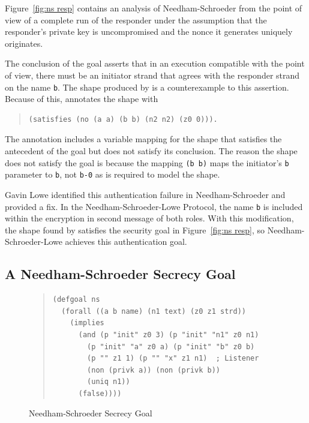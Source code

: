 Figure~\ref{fig:ns resp} contains an analysis of Needham-Schroeder
from the point of view of a complete run of the responder under the
assumption that the responder's private key is uncompromised and the
nonce it generates uniquely originates.

The conclusion of the goal asserts that in an execution compatible
with the point of view, there must be an initiator strand that agrees
with the responder strand on the name \texttt{b}.  The shape produced
by {\cpsa} is a counterexample to this assertion.  Because of this,
{\cpsa} annotates the shape with
\begin{quote}
\begin{verbatim}
(satisfies (no (a a) (b b) (n2 n2) (z0 0))).
\end{verbatim}
\end{quote}
The annotation includes a variable mapping for the shape that
satisfies the antecedent of the goal but does not satisfy its
conclusion.  The reason the shape does not satisfy the goal is because
the mapping \texttt{(b b)} maps the initiator's \texttt{b} parameter
to \texttt{b}, not \texttt{b-0} as is required to model the shape.

Gavin Lowe identified this authentication failure in
Needham-Schroeder and provided a fix.  In the Needham-Schroeder-Lowe
Protocol, the name \texttt{b} is included within the encryption in second
message of both roles.  With this modification, the shape found by
{\cpsa} satisfies the security goal in Figure~\ref{fig:ns resp}, so
Needham-Schroeder-Lowe achieves this authentication goal.

\subsection{A Needham-Schroeder Secrecy Goal}\label{sec:secrecy goal}

\begin{figure}
\begin{quote}\small
\begin{verbatim}
(defgoal ns
  (forall ((a b name) (n1 text) (z0 z1 strd))
    (implies
      (and (p "init" z0 3) (p "init" "n1" z0 n1)
        (p "init" "a" z0 a) (p "init" "b" z0 b)
        (p "" z1 1) (p "" "x" z1 n1)  ; Listener
        (non (privk a)) (non (privk b))
        (uniq n1))
      (false))))
\end{verbatim}
\end{quote}
\caption{Needham-Schroeder Secrecy Goal}\label{fig:ns secrecy}
\end{figure}

